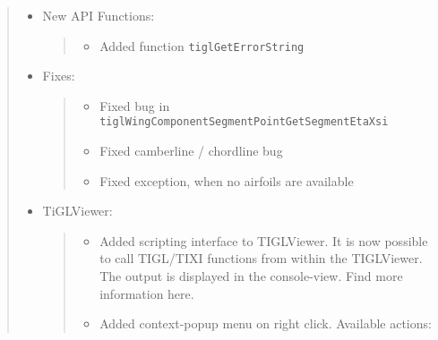 \documentclass[]{scrartcl}
\begin{document}
\begin{quote}
\begin{itemize}
\item
  New API Functions:

  \begin{quote}
  \begin{itemize}
  \itemsep1pt\parskip0pt
  \item
    Added function \texttt{tiglGetErrorString}
  \end{itemize}
  \end{quote}
\item
  Fixes:

  \begin{quote}
  \begin{itemize}
  \itemsep1pt\parskip0pt
  \item
    Fixed bug in \texttt{tiglWingComponentSegmentPointGetSegmentEtaXsi}
  \item
    Fixed camberline / chordline bug
  \item
    Fixed exception, when no airfoils are available
  \end{itemize}
  \end{quote}
\item
  TiGLViewer:

  \begin{quote}
  \begin{itemize}
  \item
    Added scripting interface to TIGLViewer. It is now possible to call
    TIGL/TIXI functions from within the TIGLViewer. The output is
    displayed in the console-view. Find more information here.
  \item
    Added context-popup menu on right click. Available actions:


\end{itemize}
\end{quote}
\end{itemize}
\end{quote}
\end{document}

